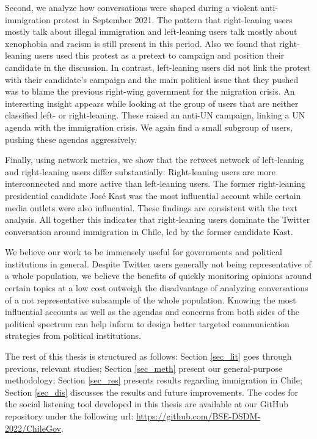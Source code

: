     Second, we analyze how conversations were shaped during a violent anti-immigration protest in September 2021. The pattern that right-leaning users mostly talk about illegal immigration and left-leaning users talk mostly about xenophobia and racism is still present in this period. Also we found that right-leaning users used this protest as a pretext to campaign and position their candidate in the discussion. In contrast, left-leaning users did not link the protest with their candidate's campaign and the main political issue that they pushed was to blame the previous right-wing government for the migration crisis. An interesting insight appears while looking at the group of users that are neither classified left- or right-leaning. These raised an anti-UN campaign, linking a UN agenda with the immigration crisis. We again find a small subgroup of users, pushing these agendas aggressively.
    
    Finally, using network metrics, we show that the retweet network of left-leaning and right-leaning users differ substantially: Right-leaning users are more interconnected and more active than left-leaning users. The former right-leaning presidential candidate José Kast was the most influential account while certain media outlets were also influential. These findings are consistent with the text analysis. All together this indicates that right-leaning users dominate the Twitter conversation around immigration in Chile, led by the former candidate Kast. 
    
    We believe our work to be immensely useful for governments and political institutions in general. Despite Twitter users generally not being representative of a whole population, we believe the benefits of quickly monitoring opinions around certain topics at a low cost outweigh the disadvantage of analyzing conversations of a not representative subsample of the whole population. Knowing the most influential accounts as well as the agendas and concerns from both sides of the political spectrum can help inform to design better targeted communication strategies from political institutions.
    
    The rest of this thesis is structured as follows: Section \ref{sec_lit} goes through previous, relevant studies; Section \ref{sec_meth} present our general-purpose methodology; Section \ref{sec_res} presents results regarding immigration in Chile; Section \ref{sec_dis} discusses the results and future improvements. The codes for the social listening tool developed in this thesis are available at our GitHub repository under the following url: \url{https://github.com/BSE-DSDM-2022/ChileGov}.
    
    
    
